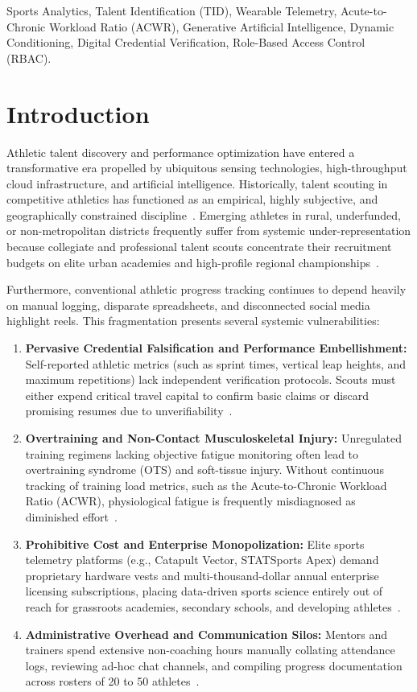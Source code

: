 \documentclass[conference]{IEEEtran}
\begin{document}
\begin{IEEEkeywords}
Sports Analytics, Talent Identification (TID), Wearable Telemetry, Acute-to-Chronic Workload Ratio (ACWR), Generative Artificial Intelligence, Dynamic Conditioning, Digital Credential Verification, Role-Based Access Control (RBAC).
\end{IEEEkeywords}

\section{Introduction}
Athletic talent discovery and performance optimization have entered a transformative era propelled by ubiquitous sensing technologies, high-throughput cloud infrastructure, and artificial intelligence. Historically, talent scouting in competitive athletics has functioned as an empirical, highly subjective, and geographically constrained discipline~\cite{sarmento2018}. Emerging athletes in rural, underfunded, or non-metropolitan districts frequently suffer from systemic under-representation because collegiate and professional talent scouts concentrate their recruitment budgets on elite urban academies and high-profile regional championships~\cite{baker2010}. 

Furthermore, conventional athletic progress tracking continues to depend heavily on manual logging, disparate spreadsheets, and disconnected social media highlight reels. This fragmentation presents several systemic vulnerabilities:
\begin{enumerate}
    \item \textbf{Pervasive Credential Falsification and Performance Embellishment:} Self-reported athletic metrics (such as sprint times, vertical leap heights, and maximum repetitions) lack independent verification protocols. Scouts must either expend critical travel capital to confirm basic claims or discard promising resumes due to unverifiability~\cite{phillips2021}.
    \item \textbf{Overtraining and Non-Contact Musculoskeletal Injury:} Unregulated training regimens lacking objective fatigue monitoring often lead to overtraining syndrome (OTS) and soft-tissue injury. Without continuous tracking of training load metrics, such as the Acute-to-Chronic Workload Ratio (ACWR), physiological fatigue is frequently misdiagnosed as diminished effort~\cite{gabbett2016}.
    \item \textbf{Prohibitive Cost and Enterprise Monopolization:} Elite sports telemetry platforms (e.g., Catapult Vector, STATSports Apex) demand proprietary hardware vests and multi-thousand-dollar annual enterprise licensing subscriptions, placing data-driven sports science entirely out of reach for grassroots academies, secondary schools, and developing athletes~\cite{bourdon2017}.
    \item \textbf{Administrative Overhead and Communication Silos:} Mentors and trainers spend extensive non-coaching hours manually collating attendance logs, reviewing ad-hoc chat channels, and compiling progress documentation across rosters of 20 to 50 athletes~\cite{paul2015}.
\end{enumerate}
\end{document}
